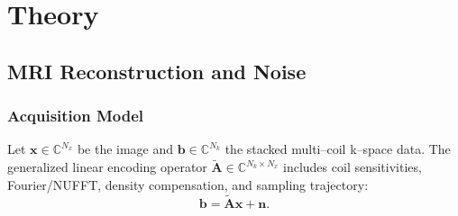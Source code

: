\documentclass[AMA,STIX2COL,Linenumberson]{MRM}
\begin{document}

\section{Theory}
\label{sec:theory}

\subsection{MRI Reconstruction and Noise}

\subsubsection{Acquisition Model}
Let $\mathbf{x}\in\mathbb{C}^{N_x}$ be the image and $\mathbf{b}\in\mathbb{C}^{N_k}$ the stacked multi–coil k–space data. The generalized linear encoding operator $\widetilde{\mathbf{A}}\in\mathbb{C}^{N_k\times N_x}$ includes coil sensitivities, Fourier/NUFFT, density compensation, and sampling trajectory:
\begin{equation}
\mathbf{b}=\widetilde{\mathbf{A}}\mathbf{x}+\mathbf{n}.
\label{eq:forward_model_original_theory}
\end{equation}
\end{document}
